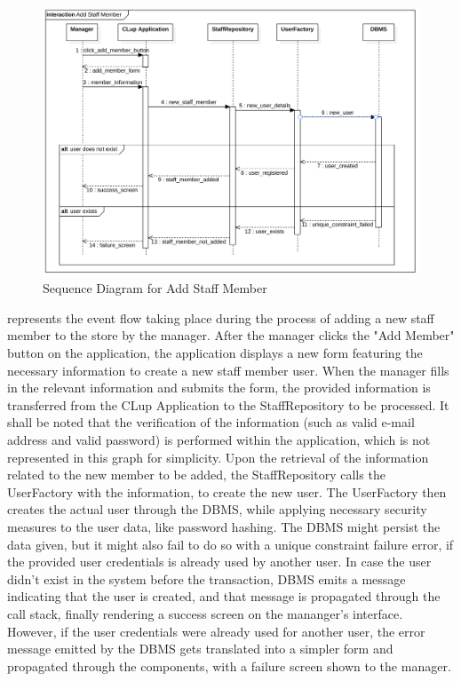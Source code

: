 \begin{figure}[H]
    \centering
    \includegraphics[height=0.4\textwidth]{Images/SequenceDiagrams/AddStaffMember.png}
    \caption{Sequence Diagram for Add Staff Member}
    \label{fig:SDAddStaffMember}
\end{figure}
 represents the event flow taking place during the process of adding a new staff member to the store by the manager.
After the manager clicks the "Add Member" button on the application, the application displays a new form featuring the necessary information to create a new staff member user.
When the manager fills in the relevant information and submits the form, the provided information is transferred from the CLup Application to the StaffRepository to be processed.
It shall be noted that the verification of the information (such as valid e-mail address and valid password) is performed within the application, which is not represented in this graph for simplicity.
Upon the retrieval of the information related to the new member to be added, the StaffRepository calls the UserFactory with the information, to create the new user.
The UserFactory then creates the actual user through the DBMS, while applying necessary security measures to the user data, like password hashing.
The DBMS might persist the data given, but it might also fail to do so with a unique constraint failure error, if the provided user credentials is already used by another user.
In case the user didn't exist in the system before the transaction, DBMS emits a message indicating that the user is created, and that message is propagated through the call stack, finally rendering a success screen on the mananger's interface.
However, if the user credentials were already used for another user, the error message emitted by the DBMS gets translated into a simpler form and propagated through the components, with a failure screen shown to the manager.
